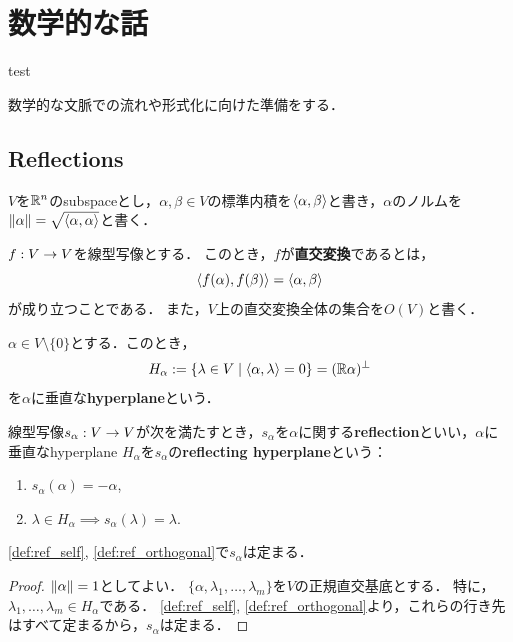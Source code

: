 \section{数学的な話}
\begin{theorem}
  test
\end{theorem}

数学的な文脈での流れや形式化に向けた準備をする．
\subsection{Reflections}
$V$を$\mathbb{R}^n$のsubspaceとし，$\alpha, \beta \in V$の標準内積を$\left\langle \alpha, \beta \right\rangle$と書き，$\alpha$のノルムを$\left\| \alpha \right\| = \sqrt{\left\langle \alpha, \alpha \right\rangle}$と書く．

\begin{definition}
  $f : V \rightarrow V$を線型写像とする．
  このとき，$f$が\textbf{直交変換}であるとは，
  \begin{equation}
    \left\langle f(\alpha), f(\beta) \right\rangle = \left\langle \alpha, \beta \right\rangle
  \end{equation}
  が成り立つことである．
  また，$V$上の直交変換全体の集合を$O(V)$と書く．
\end{definition}

\begin{definition}
  $\alpha \in V \setminus \{0\}$とする．このとき，
  \begin{equation}
    H_\alpha := \left\lbrace \lambda \in V \mathrel{} \middle| \mathrel{} \left\langle \alpha, \lambda \right\rangle = 0 \right\rbrace = (\mathbb{R} \alpha)^{\perp}
  \end{equation}
  を$\alpha$に垂直な\textbf{hyperplane}という．
\end{definition}

\begin{definition}
  線型写像$s_\alpha : V \rightarrow V$が次を満たすとき，$s_\alpha$を$\alpha$に関する\textbf{reflection}といい，$\alpha$に垂直なhyperplane $H_\alpha$を$s_\alpha$の\textbf{reflecting hyperplane}という：
  \begin{enumerate}[label=(\roman*)]
    \item $s_\alpha (\alpha) = -\alpha$, \label{def:ref_self}
    \item $\lambda \in H_\alpha \implies s_\alpha(\lambda) = \lambda$. \label{def:ref_orthogonal}
  \end{enumerate}
\end{definition}

\begin{remark}
  \ref{def:ref_self}, \ref{def:ref_orthogonal}で$s_\alpha$は定まる．
\end{remark}
\begin{proof}
  $\left\| \alpha \right\| = 1$としてよい．
  $\{\alpha, \lambda_1, \ldots, \lambda_m\}$を$V$の正規直交基底とする．
  特に，$\lambda_1, \ldots, \lambda_m \in H_\alpha$である．
  \ref{def:ref_self}, \ref{def:ref_orthogonal}より，これらの行き先はすべて定まるから，$s_\alpha$は定まる．
\end{proof}

